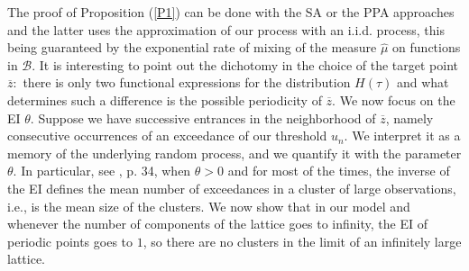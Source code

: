 \documentclass[12pt,reqno,a4paper]{amsart}
\begin{document}
 The proof of Proposition (\ref{P1}) can be done with  the SA or the  PPA approaches and  the latter uses the approximation of our process with an i.i.d.  process, this being guaranteed   by the exponential rate of mixing of the measure $\hat{\mu}$ on functions in $\mathcal{B}.$ It is interesting to point out the dichotomy in the choice of the target point $\overline{z}:$ there is only two functional expressions for the distribution $H(\tau)$ and what determines such a difference is the possible periodicity of $\overline{z}$.  We now focus on the EI $\theta$. Suppose we have successive  entrances in the neighborhood of $\overline{z}$, namely consecutive occurrences of an exceedance of our threshold $u_n.$ We interpret it as a memory of the underlying random process, and we quantify it with the parameter $\theta$. In particular, see \cite{ERDS}, p. 34, when $\theta > 0$ and for most of the times, the inverse of the EI  defines the mean
number of exceedances  in a cluster of large observations, i.e., is the
mean size of the clusters. We now show that in our model and whenever the number of components of the lattice goes to infinity, the EI of periodic points goes to $1$, so  there are no  clusters   in the limit of an infinitely large lattice.
\end{document}
